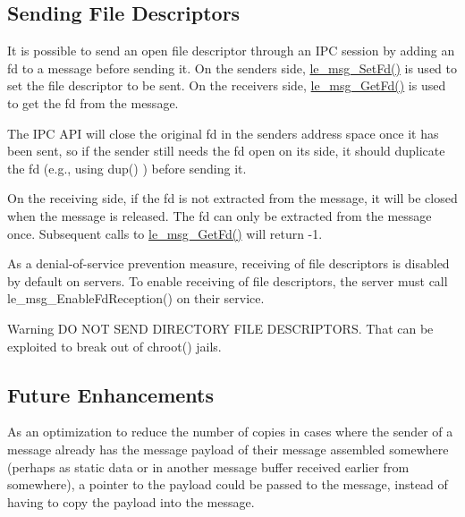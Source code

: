 \hypertarget{c_messaging_c_messagingSendingFileDescriptors}{}\subsection{Sending File Descriptors}\label{c_messaging_c_messagingSendingFileDescriptors}
It is possible to send an open file descriptor through an I\+P\+C session by adding an fd to a message before sending it. On the sender\textquotesingle{}s side, \hyperlink{le__messaging_8h_a43459773ce8a9febf0f2e66681e40e91}{le\+\_\+msg\+\_\+\+Set\+Fd()} is used to set the file descriptor to be sent. On the receiver\textquotesingle{}s side, \hyperlink{le__messaging_8h_a1eff9dd7f93de58f5678ad3d6e0b734d}{le\+\_\+msg\+\_\+\+Get\+Fd()} is used to get the fd from the message.

The I\+P\+C A\+P\+I will close the original fd in the sender\textquotesingle{}s address space once it has been sent, so if the sender still needs the fd open on its side, it should duplicate the fd (e.\+g., using dup() ) before sending it.

On the receiving side, if the fd is not extracted from the message, it will be closed when the message is released. The fd can only be extracted from the message once. Subsequent calls to \hyperlink{le__messaging_8h_a1eff9dd7f93de58f5678ad3d6e0b734d}{le\+\_\+msg\+\_\+\+Get\+Fd()} will return -\/1.

As a denial-\/of-\/service prevention measure, receiving of file descriptors is disabled by default on servers. To enable receiving of file descriptors, the server must call le\+\_\+msg\+\_\+\+Enable\+Fd\+Reception() on their service.

\begin{DoxyWarning}{Warning}
D\+O N\+O\+T S\+E\+N\+D D\+I\+R\+E\+C\+T\+O\+R\+Y F\+I\+L\+E D\+E\+S\+C\+R\+I\+P\+T\+O\+R\+S. That can be exploited to break out of chroot() jails.
\end{DoxyWarning}
\hypertarget{c_messaging_c_messagingFutureEnhancements}{}\subsection{Future Enhancements}\label{c_messaging_c_messagingFutureEnhancements}
As an optimization to reduce the number of copies in cases where the sender of a message already has the message payload of their message assembled somewhere (perhaps as static data or in another message buffer received earlier from somewhere), a pointer to the payload could be passed to the message, instead of having to copy the payload into the message.



